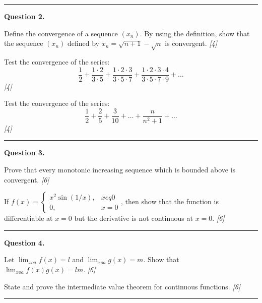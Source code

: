 \documentclass[11pt,a4paper]{article}
\newcommand{\pts}[1]{\hfill   \textit{[#1]}}
\begin{document}
\medskip\rule{\linewidth}{0.2pt}

\medskip


\noindent   \textbf{Question 2.}

\begin{parts}
  \item Define the convergence of a sequence $(x_n)$. By using the definition, show that the sequence $(x_n)$ defined by $x_n = \sqrt{n+1} - \sqrt{n}$ is convergent. \pts{4}
  \item Test the convergence of the series:
  \[
  \frac{1}{2} + \frac{1 \cdot 2}{3 \cdot 5} + \frac{1 \cdot 2 \cdot 3}{3 \cdot 5 \cdot 7} + \frac{1 \cdot 2 \cdot 3 \cdot 4}{3 \cdot 5 \cdot 7 \cdot 9} + \dots
  \] \pts{4}
  \item Test the convergence of the series:
  \[
  \frac{1}{2} + \frac{2}{5} + \frac{3}{10} + \dots + \frac{n}{n^2+1} + \dots
  \] \pts{4}
\end{parts}

\medskip\rule{\linewidth}{0.2pt}

\medskip


\noindent   \textbf{Question 3.}

\begin{parts}
  \item Prove that every monotonic increasing sequence which is bounded above is convergent. \pts{6}
  \item If $f(x) = 
\begin{cases} x^2 \sin(1/x), & x 
eq 0 \\ 0, & x = 0 \end{cases}$, then show that the function is differentiable at $x = 0$ but the derivative is not continuous at $x = 0$. \pts{6}
\end{parts}

\medskip\rule{\linewidth}{0.2pt}

\medskip


\noindent   \textbf{Question 4.}

\begin{parts}
  \item Let $\lim_{x o a} f(x) = l$ and $\lim_{x o a} g(x) = m$. Show that $\lim_{x o a} f(x)g(x) = lm$. \pts{6}
  \item State and prove the intermediate value theorem for continuous functions. \pts{6}
\end{parts}

\medskip\rule{\linewidth}{0.2pt}

\medskip
\end{document}
